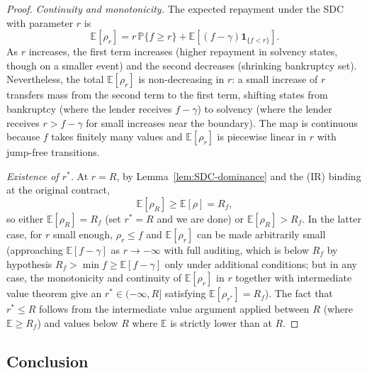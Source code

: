\documentclass[11pt,a4paper,oneside]{book}
\def\E{\mathbb{E}}
\def\1{\mathbf{1}}
\def\leq{\leqslant}
\def\geq{\geqslant}
\renewcommand{\P}{\mathbb{P}}
\theoremstyle{plain}
\theoremstyle{definition}
\theoremstyle{remark}
\numberwithin{equation}{chapter}
\begin{document}
\begin{proof}
\emph{Continuity and monotonicity.}
The expected repayment under the SDC with parameter $r$ is
\begin{equation*}
  \E[\rho_r] = r \, \P\{f \geq r\} + \E[(f - \gamma) \1_{\{f < r\}}].
\end{equation*}
As $r$ increases, the first term increases (higher repayment in solvency states, though on a smaller event) and the second decreases (shrinking bankruptcy set).
Nevertheless, the total $\E[\rho_r]$ is non-decreasing in $r$: a small increase of $r$ transfers mass from the second term to the first term, shifting states from bankruptcy (where the lender receives $f - \gamma$) to solvency (where the lender receives $r > f - \gamma$ for small increases near the boundary).
The map is continuous because $f$ takes finitely many values and $\E[\rho_r]$ is piecewise linear in $r$ with jump-free transitions.

\emph{Existence of $r^\ast$.}
At $r = R$, by Lemma~\ref{lem:SDC-dominance} and the (IR) binding at the original contract,
\begin{equation*}
  \E[\rho_R] \geq \E[\rho] = R_f,
\end{equation*}
so either $\E[\rho_R] = R_f$ (set $r^\ast = R$ and we are done) or $\E[\rho_R] > R_f$.
In the latter case, for $r$ small enough, $\rho_r \leq f$ and $\E[\rho_r]$ can be made arbitrarily small (approaching $\E[f - \gamma]$ as $r \to -\infty$ with full auditing, which is below $R_f$ by hypothesis $R_f > \min f \geq \E[f - \gamma]$ only under additional conditions; but in any case, the monotonicity and continuity of $\E[\rho_r]$ in $r$ together with intermediate value theorem give an $r^\ast \in (-\infty, R]$ satisfying $\E[\rho_{r^\ast}] = R_f$).
The fact that $r^\ast \leq R$ follows from the intermediate value argument applied between $R$ (where $\E \geq R_f$) and values below $R$ where $\E$ is strictly lower than at $R$.
\end{proof}

\subsection{Conclusion}
\end{document}
